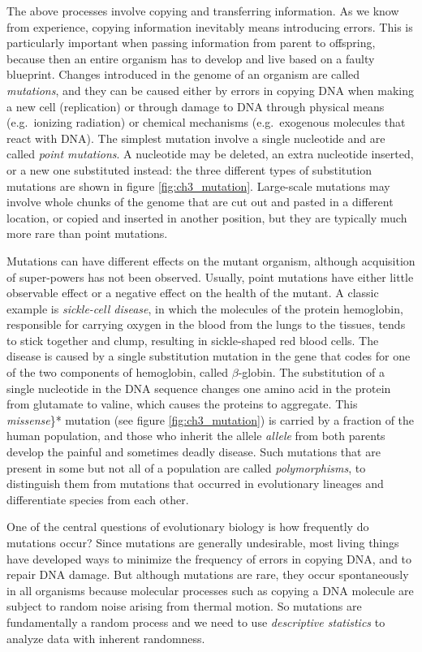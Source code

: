 \documentclass[
  letterpaper,
  DIV=11,
  numbers=noendperiod]{scrreprt}
\begin{document}
The above processes involve copying and transferring information. As we
know from experience, copying information inevitably means introducing
errors. This is particularly important when passing information from
parent to offspring, because then an entire organism has to develop and
live based on a faulty blueprint. Changes introduced in the genome of an
organism are called  \emph{mutations}, and
they can be caused either by errors in copying DNA when making a new
cell (replication) or through damage to DNA through physical means
(e.g.~ionizing radiation) or chemical mechanisms (e.g.~exogenous
molecules that react with DNA). The simplest mutation involve a single
nucleotide and are called  \emph{point mutations}.
A nucleotide may be deleted, an extra nucleotide inserted, or a new one
substituted instead: the three different types of substitution mutations
are shown in figure \ref{fig:ch3_mutation}. Large-scale mutations may
involve whole chunks of the genome that are cut out and pasted in a
different location, or copied and inserted in another position, but they
are typically much more rare than point mutations.

Mutations can have different effects on the mutant organism, although
acquisition of super-powers has not been observed. Usually, point
mutations have either little observable effect or a negative effect on
the health of the mutant. A classic example is
 \emph{sickle-cell disease}, in which the
molecules of the protein hemoglobin, responsible for carrying oxygen in
the blood from the lungs to the tissues, tends to stick together and
clump, resulting in sickle-shaped red blood cells. The disease is caused
by a single substitution mutation in the gene that codes for one of the
two components of hemoglobin, called \(\beta\)-globin. The substitution
of a single nucleotide in the DNA sequence changes one amino acid in the
protein from glutamate to valine, which causes the proteins to
aggregate. This  \emph{missense}\}* mutation
(see figure \ref{fig:ch3_mutation}) is carried by a fraction of the
human population, and those who inherit the allele \emph{allele} from
both parents develop the painful and sometimes deadly disease. Such
mutations that are present in some but not all of a population are
called  \emph{polymorphisms}, to
distinguish them from mutations that occurred in evolutionary lineages
and differentiate species from each other.

One of the central questions of evolutionary biology is how frequently
do mutations occur? Since mutations are generally undesirable, most
living things have developed ways to minimize the frequency of errors in
copying DNA, and to repair DNA damage. But although mutations are rare,
they occur spontaneously in all organisms because molecular processes
such as copying a DNA molecule are subject to random noise arising from
thermal motion. So mutations are fundamentally a random process and we
need to use  \emph{descriptive statistics}
to analyze data with inherent randomness.
\end{document}
